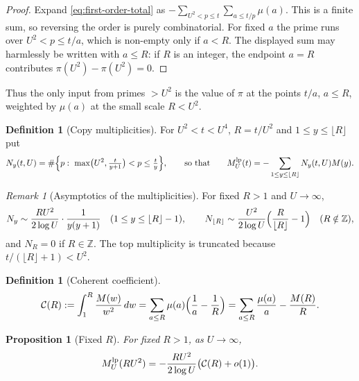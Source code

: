 \documentclass[11pt]{amsart}
\numberwithin{equation}{section}
\theoremstyle{plain}
\newtheorem{proposition}[theorem]{Proposition}
\theoremstyle{definition}
\newtheorem{definition}[theorem]{Definition}
\theoremstyle{remark}
\newtheorem{remark}[theorem]{Remark}
\newcommand{\Cc}{\mathcal{C}}
\begin{document}
\begin{proof}
Expand \eqref{eq:first-order-total} as
$-\sum_{U^2<p\le t}\sum_{a\le t/p}\mu(a)$.  This is a finite sum, so
reversing the order is purely combinatorial.  For fixed $a$ the prime runs
over $U^2<p\le t/a$, which is non-empty only if $a<R$.  The displayed sum
may harmlessly be written with $a\le R$: if $R$ is an integer, the endpoint
$a=R$ contributes $\pi(U^2)-\pi(U^2)=0$.
\end{proof}

Thus the only input from primes $>U^2$ is the value of $\pi$ at the points
$t/a$, $a\le R$, weighted by $\mu(a)$ at the small scale $R<U^2$.

\begin{definition}[Copy multiplicities]
\label{def:copy-multiplicity}
For $U^2<t<U^4$, $R=t/U^2$ and $1\le y\le\lfloor R\rfloor$ put
\begin{equation}
\label{eq:Ny-exact}
  N_y(t,U)=\#\Bigl\{p:\ \max\bigl(U^2,\tfrac{t}{y+1}\bigr)<p\le\tfrac ty\Bigr\},
  \qquad\text{so that}\qquad
  M^{\rm lp}_U(t)=-\sum_{1\le y\le\lfloor R\rfloor}N_y(t,U)M(y).
\end{equation}
\end{definition}

\begin{remark}[Asymptotics of the multiplicities]
\label{rem:copy-count-asymptotic}
For fixed $R>1$ and $U\to\infty$,
\begin{equation}
\label{eq:Ny-fixed-R}
  N_y\sim\frac{RU^2}{2\log U}\cdot\frac1{y(y+1)}\quad(1\le y\le\lfloor R\rfloor-1),
  \qquad
  N_{\lfloor R\rfloor}\sim\frac{U^2}{2\log U}\Bigl(\frac R{\lfloor R\rfloor}-1\Bigr)
  \quad(R\notin\mathbb{Z}),
\end{equation}
and $N_R=0$ if $R\in\mathbb{Z}$. The top multiplicity is truncated because
$t/(\lfloor R\rfloor+1)<U^2$.
\end{remark}

\begin{definition}[Coherent coefficient]
\label{def:coherent_coefficient}
\begin{equation}
\label{eq:C_def}
  \Cc(R):=\int_1^R\frac{M(w)}{w^2}\,dw
  =\sum_{a\le R}\mu(a)\Bigl(\frac1a-\frac1R\Bigr)
  =\sum_{a\le R}\frac{\mu(a)}a-\frac{M(R)}R .
\end{equation}
\end{definition}

\begin{proposition}[Fixed $R$]
\label{prop:fixed_R_corrected}
For fixed $R>1$, as $U\to\infty$,
\begin{equation}
\label{eq:E_fixed_R}
  M^{\rm lp}_U(RU^2)=-\frac{RU^2}{2\log U}\bigl(\Cc(R)+o(1)\bigr).
\end{equation}
\end{proposition}
\end{document}
